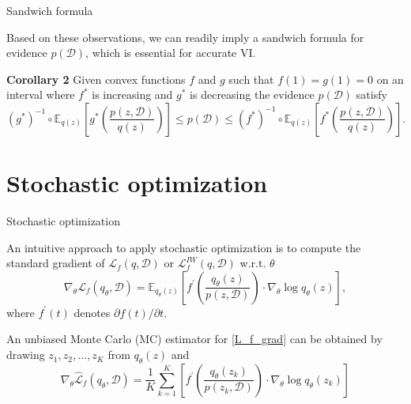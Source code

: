 \documentclass{beamer}
\begin{document}
\begin{frame}{Sandwich formula}
    \begin{block}{}
        Based on these observations, we can readily imply a sandwich formula for evidence $p(\mathcal{D})$, which is essential for accurate VI.

        \textbf{Corollary 2} Given convex functions $f$ and $g$ such that $f(1) = g(1) = 0$ on an interval where $f^*$ is increasing and $g^*$ is decreasing the evidence $p(\mathcal{D})$ satisfy
        \begin{equation}\label{corol2}
            (g^*)^{-1} \circ \mathbb{E}_{q(z)}\left[g^*\left(\dfrac{p(z, \mathcal{D})}{q(z)}\right)\right] \leqslant p(\mathcal{D}) \leqslant (f^*)^{-1} \circ \mathbb{E}_{q(z)}\left[f^*\left(\dfrac{p(z, \mathcal{D})}{q(z)}\right)\right].
        \end{equation}
    \end{block}
\end{frame}

\section{Stochastic optimization}

\begin{frame}{Stochastic optimization}
    \begin{block}{}
        An intuitive approach to apply stochastic optimization is to compute the standard gradient of $\mathcal{L}_f(q, \mathcal{D})$ or $\mathcal{L}_f^{IW}(q, \mathcal{D})$ w.r.t. $\theta$
        \begin{equation}\label{L_f_grad}
            \nabla_{\theta}\mathcal{L}_f(q_\theta, \mathcal{D}) = \mathbb{E}_{q_\theta(z)}\left[f^{'}\left(\dfrac{q_\theta(z)}{p(z, \mathcal{D})}\right)\cdot\nabla_\theta\log q_\theta(z)\right],
        \end{equation}
        where $f^{'}(t)$ denotes $\partial f(t) \slash \partial t$.

        An unbiased Monte Carlo (MC) estimator for \eqref{L_f_grad} can be obtained by drawing $z_1, z_2, \ldots, z_K$ from $q_\theta(z)$ and
        \begin{equation}\label{L_f_estim}
            \nabla_{\theta}\hat{\mathcal{L}}_f(q_\theta, \mathcal{D}) = \dfrac{1}{K}\sum_{k=1}^K\left[f^{'}\left(\dfrac{q_\theta(z_k)}{p(z_k, \mathcal{D})}\right)\cdot\nabla_\theta\log q_\theta(z_k)\right]
        \end{equation}
    \end{block}
\end{frame}
\end{document}
